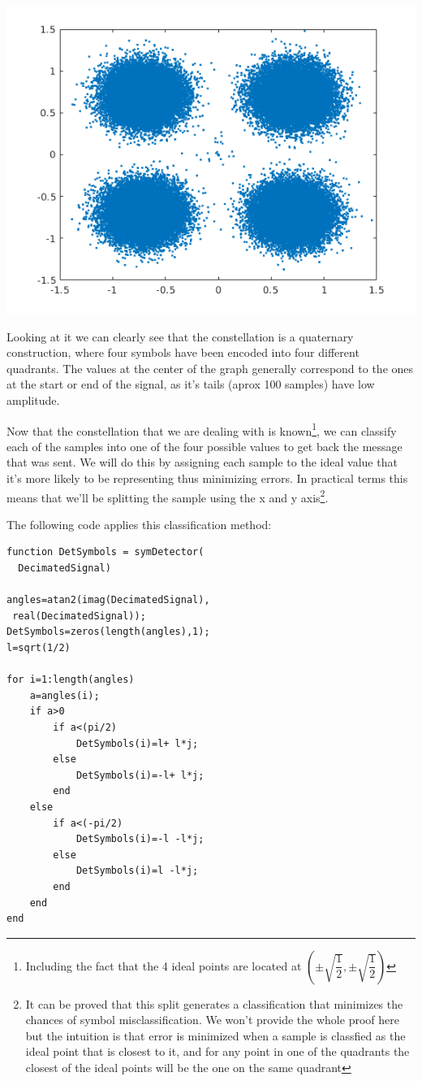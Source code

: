 \documentclass[conference,9pt]{IEEEtran}
\begin{document}
\includegraphics[scale=0.6]{res}

Looking at it we can clearly see that the constellation is a quaternary construction, where four symbols have been encoded into four different quadrants. The values at the center of the graph generally correspond to the ones at the start or end of the signal, as it's tails (aprox 100 samples) have low amplitude.

Now that the constellation that we are dealing with is known\footnote{Including the fact that the 4 ideal points are located at $(\pm\sqrt{\dfrac{1}{2}}, \pm\sqrt{\dfrac{1}{2}})$}, we can classify each of the samples into one of the four possible values to get back the message that was sent. We will do this by assigning each sample to the ideal value that it's more likely to be representing thus minimizing errors. In practical terms this means that we'll be splitting the sample using the x and y axis\footnote{It can be proved that this split generates a classification that minimizes the chances of symbol misclassification. We won't provide the whole proof here but the intuition is that error is minimized when a sample is classfied as the ideal point that is closest to it, and for any point in one of the quadrants the closest of the ideal points will be the one on the same quadrant}.

The following code applies this classification method:
\begin{verbatim}
function DetSymbols = symDetector(
  DecimatedSignal)

angles=atan2(imag(DecimatedSignal),
 real(DecimatedSignal));
DetSymbols=zeros(length(angles),1);
l=sqrt(1/2)

for i=1:length(angles)
    a=angles(i);
    if a>0
        if a<(pi/2)
            DetSymbols(i)=l+ l*j;
        else
            DetSymbols(i)=-l+ l*j;
        end
    else
        if a<(-pi/2)
            DetSymbols(i)=-l -l*j;
        else
            DetSymbols(i)=l -l*j;
        end
    end
end
\end{verbatim}
\end{document}
